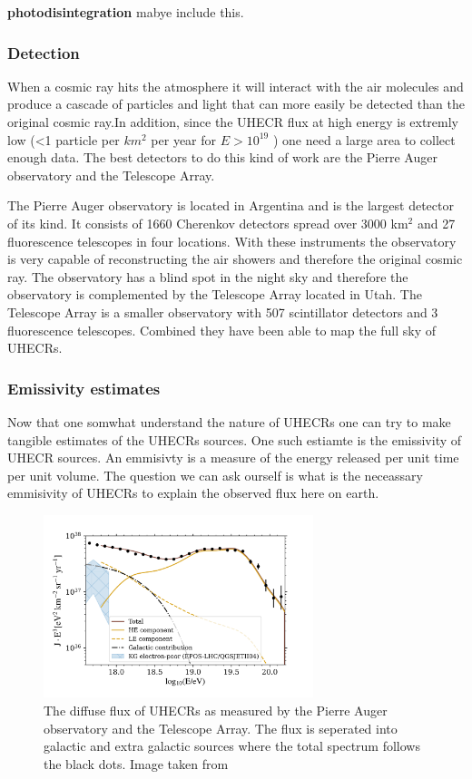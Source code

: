\documentclass{article}
\begin{document}
\textbf{photodisintegration}
mabye include this. 

\subsubsection{Detection}
When a cosmic ray hits the atmosphere it will interact with the air molecules and produce a cascade of particles and light that can more easily be detected than 
the original cosmic ray.In addition, since the UHECR flux at high energy is extremly low (<1 particle per $km^2$ per year for $E > 10^{19}$ ) one need a large area to collect enough data. 
The best detectors to do this kind of work are the Pierre Auger observatory and the Telescope Array. 

The Pierre Auger observatory is located in Argentina and is the largest detector of its kind. It consists of 1660  Cherenkov detectors spread over 3000 km$^2$ and 27 fluorescence telescopes in four locations. With 
these instruments the observatory is very capable of reconstructing the air showers and therefore the original cosmic ray. The observatory has a blind spot in the night sky 
and therefore the observatory is complemented by the Telescope Array located in Utah. The Telescope Array is a smaller observatory with 507 scintillator detectors and 3 fluorescence telescopes. Combined they have been able to map the full sky of UHECRs.  

\subsubsection{Emissivity estimates}
\label{sec:emmisivity}

Now that one somwhat understand the nature of UHECRs one can try to make tangible estimates of the UHECRs sources. One such
estiamte is the emissivity of UHECR sources. An emmisivty is a measure of the energy released per unit time per unit volume. The question 
we can ask ourself is what is the neceassary emmisivity of UHECRs to explain the observed flux here on earth.


\begin{figure}
    \centering
    \includegraphics[width = 0.7\textwidth]{UHECRs.png}
    \caption{The diffuse flux of UHECRs as measured by the Pierre Auger observatory and the Telescope Array. The flux is seperated into galactic and extra galactic sources where the total spectrum follows the black dots. Image taken from \cite{Abdul_Halim_2023}}
    \label{fig:flux_UHECRs}
\end{figure}
\end{document}
